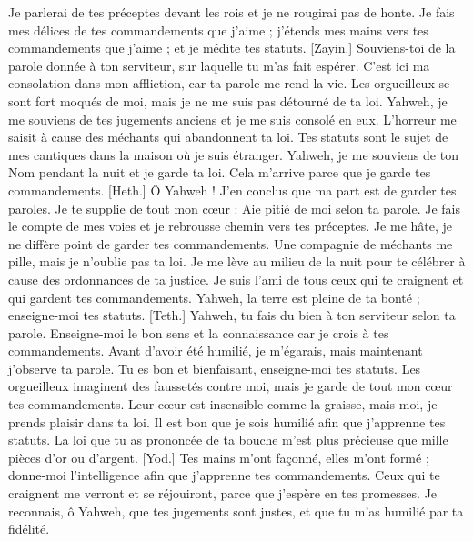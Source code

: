 \begin{multicols}{2}
Je parlerai de tes préceptes devant les rois et je ne rougirai pas de honte.
Je fais mes délices de tes commandements que j'aime ;
j'étends mes mains vers tes commandements que j'aime ; et je médite tes statuts.
[Zayin.] Souviens-toi de la parole donnée à ton serviteur, sur laquelle tu m'as fait espérer.
C'est ici ma consolation dans mon affliction, car ta parole me rend la vie.
Les orgueilleux se sont fort moqués de moi, mais je ne me suis pas détourné de ta loi.
Yahweh, je me souviens de tes jugements anciens et je me suis consolé en eux.
L'horreur me saisit à cause des méchants qui abandonnent ta loi.
Tes statuts sont le sujet de mes cantiques dans la maison où je suis étranger.
Yahweh, je me souviens de ton Nom pendant la nuit et je garde ta loi.
Cela m'arrive parce que je garde tes commandements.
[Heth.] Ô Yahweh ! J'en conclus que ma part est de garder tes paroles.
Je te supplie de tout mon cœur : Aie pitié de moi selon ta parole.
Je fais le compte de mes voies et je rebrousse chemin vers tes préceptes.
Je me hâte, je ne diffère point de garder tes commandements.
Une compagnie de méchants me pille, mais je n'oublie pas ta loi.
Je me lève au milieu de la nuit pour te célébrer à cause des ordonnances de ta justice.
Je suis l'ami de tous ceux qui te craignent et qui gardent tes commandements.
Yahweh, la terre est pleine de ta bonté ; enseigne-moi tes statuts.
[Teth.] Yahweh, tu fais du bien à ton serviteur selon ta parole.
Enseigne-moi le bon sens et la connaissance car je crois à tes commandements.
Avant d'avoir été humilié, je m'égarais, mais maintenant j'observe ta parole.
Tu es bon et bienfaisant, enseigne-moi tes statuts.
Les orgueilleux imaginent des faussetés contre moi, mais je garde de tout mon cœur tes commandements.
Leur cœur est insensible comme la graisse, mais moi, je prends plaisir dans ta loi.
Il est bon que je sois humilié afin que j'apprenne tes statuts.
La loi que tu as prononcée de ta bouche m'est plus précieuse que mille pièces d'or ou d'argent.
[Yod.] Tes mains m'ont façonné, elles m'ont formé ; donne-moi l'intelligence afin que j'apprenne tes commandements.
Ceux qui te craignent me verront et se réjouiront, parce que j'espère en tes promesses.
Je reconnais, ô Yahweh, que tes jugements sont justes, et que tu m'as humilié par ta fidélité.

\end{multicols}
